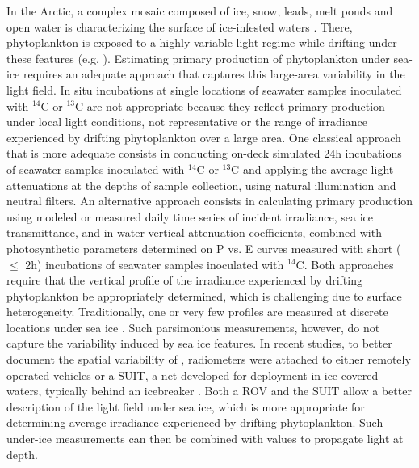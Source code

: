 In the Arctic, a complex mosaic composed of ice, snow, leads, melt ponds and open water is characterizing the surface of ice-infested waters \citep{Nicolaus2013, Katlein2015, Katlein2016}. There, phytoplankton is exposed to a highly variable light regime while drifting under these features (e.g. \citet{Lange2017b}). Estimating primary production of phytoplankton under sea-ice requires an adequate approach that captures this large-area variability in the light field. In situ incubations at single locations of seawater samples inoculated with $^{14}$C or $^{13}$C are not appropriate because they reflect primary production under local light conditions, not representative or the range of irradiance experienced by drifting phytoplankton over a large area. One classical approach that is more adequate consists in conducting on-deck simulated 24h incubations of seawater samples inoculated with $^{14}$C or $^{13}$C and applying the average light attenuations at the depths of sample collection, using natural illumination and neutral filters. An alternative approach consists in calculating primary production using modeled or measured daily time series of incident irradiance, sea ice transmittance, and in-water vertical attenuation coefficients, combined with photosynthetic parameters determined on P vs. E curves measured with short ($\le$ 2h) incubations of seawater samples inoculated with $^{14}$C. Both approaches require that the vertical profile of the irradiance experienced by drifting phytoplankton be appropriately determined, which is challenging due to surface heterogeneity. Traditionally, one or very few \edz{} profiles are measured at discrete locations under sea ice \citep{Mundy2009}. Such parsimonious measurements, however, do not capture the variability induced by sea ice features. In recent studies, to better document the spatial variability of \edz{}, radiometers were attached to either remotely operated vehicles \citep{Katlein2015} or a SUIT, a net developed for deployment in ice covered waters, typically behind an icebreaker \citep{Lange2017b}. Both a ROV and the SUIT allow a better description of the light field under sea ice, which is more appropriate for determining average irradiance experienced by drifting phytoplankton. Such under-ice measurements can then be combined with \ked{} values to propagate light at depth. 

